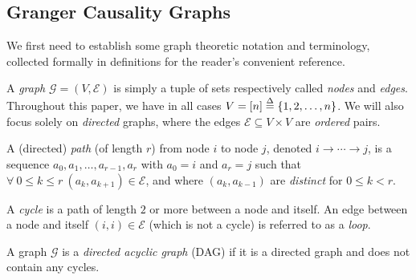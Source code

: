 \documentclass[12pt]{article}
\def\gc{\overset{\text{GC}}{\rightarrow}}  %
\def\te{\overset{\mathcal{T}}{\rightarrow}}  %
\def\gcg{\mathcal{G}}  %
\def\gcge{\mathcal{E}}  %
\newcommand{\gcgpath}[2]{#1 \rightarrow \cdots \rightarrow #2}  %
\begin{document}





\subsection{Granger Causality Graphs}
We first need to establish some graph theoretic notation and
terminology, collected formally in definitions for the reader's
convenient reference.

\begin{definition}
  A \textit{graph} $\gcg = (V, \gcge)$ is simply a
  tuple of sets respectively called \textit{nodes} and \textit{edges}.
  Throughout this paper, we have in all cases
  $V = [n] \overset{\Delta}{=} \{1, 2, \ldots, n\}$.  We will also focus solely on
  \textit{directed} graphs, where the edges
  $\gcge \subseteq V \times V$ are \textit{ordered} pairs.

  A (directed) \textit{path} (of length $r$) from node $i$ to node
  $j$, denoted $\gcgpath{i}{j}$, is a sequence
  $a_0, a_1, \ldots, a_{r - 1}, a_r$ with $a_0 = i$ and $a_r = j$ such
  that $\forall\ 0 \le k \le r\ (a_k, a_{k + 1}) \in \gcge$, and where
  $(a_k, a_{k - 1})$ are \textit{distinct} for $0 \le k < r$.

  A \textit{cycle} is a path of length $2$ or more between a node and
  itself.  An edge between a node and itself $(i, i) \in \gcge$ (which
  is not a cycle) is referred to as a \textit{loop}.

  A graph $\gcg$ is a \textit{directed acyclic graph} (DAG) if it is a
  directed graph and does not contain any cycles.
\end{definition}
\end{document}
